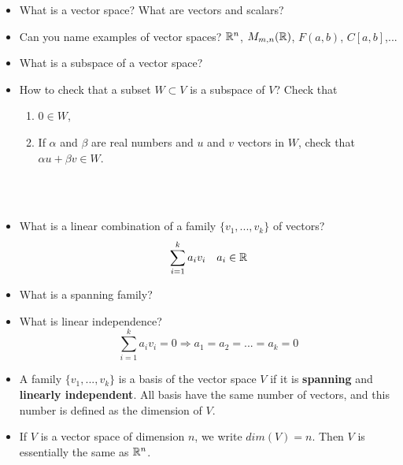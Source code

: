 \begin{itemize}
\item What is a vector space? What are vectors and scalars?
\item Can you name examples of vector spaces? $\mathbb R^n$, $M_{m,n}(\mathbb R)$, $F(a,b)$, $C[a,b]$,...
\item What is a subspace of a vector space? 
\item How to check that a subset $W \subset V$ is a subspace of $V$? Check that
\begin{enumerate}
\item $0\in W$,
\item If $\alpha$ and $\beta$ are real numbers and $u$ and $v$ vectors in $W$, check that $\alpha u + \beta v \in W$.\\
\end{enumerate} 

\\
\\

\item What is a linear combination of a family $\{v_1,...,v_k\}$ of vectors?
\[\sum_{i= 1}^k a_i v_i \quad a_i \in \mathbb R\]
\item What is a spanning family?
\item What is linear independence?
\[\sum_{i= 1}^k a_i v_i = 0  \Rightarrow a_1 = a_2 = ... = a_k = 0\]
\item A family $\{v_1,...,v_k\}$ is a basis of the vector space $V$ if it is \textbf{spanning} and \textbf{linearly independent}. All basis have the same number of vectors, and this number is defined as the dimension of $V$. 
\item If $V$ is a vector space of dimension $n$, we write $dim(V) = n$. Then $V$ is essentially the same as $\mathbb R^n$.  


\end{itemize}
